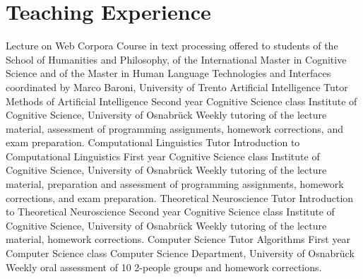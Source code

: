 \documentclass[11pt,a4paper]{moderncv}
\begin{document}
\section{Teaching Experience}
        {Lecture on Web Corpora}
        {Course in text processing}
        {offered to students of the School of Humanities and Philosophy, of the
        International Master in Cognitive Science and of the Master in Human
        Language Technologies and Interfaces}
        {coordinated by Marco Baroni, University of Trento}
        {}
        {Artificial Intelligence Tutor}
        {Methods of Artificial Intelligence}
        {Second year Cognitive Science class}
        {Institute of Cognitive Science, University of Osnabr\"{u}ck}
        {Weekly tutoring of the lecture material, assessment of programming
        assignments, homework corrections, and exam preparation.}	
        {Computational Linguistics Tutor}
        {Introduction to Computational Linguistics}
        {First year Cognitive Science class}
        {Institute of Cognitive Science, University of Osnabr\"{u}ck}
        {Weekly tutoring of the lecture material, preparation and assessment of
        programming assignments, homework corrections, and exam preparation.}
        {Theoretical Neuroscience Tutor}
        {Introduction to Theoretical Neuroscience}
        {Second year Cognitive Science class}
        {Institute of Cognitive Science, University of Osnabr\"{u}ck}
        {Weekly tutoring of the lecture material, homework corrections.}
        {Computer Science Tutor}
        {Algorithms}
        {First year Computer Science class}
        {Computer Science Department, University of Osnabr\"{u}ck}
        {Weekly oral assessment of 10 2-people groups and homework corrections.}
\closesection{}
\end{document}
